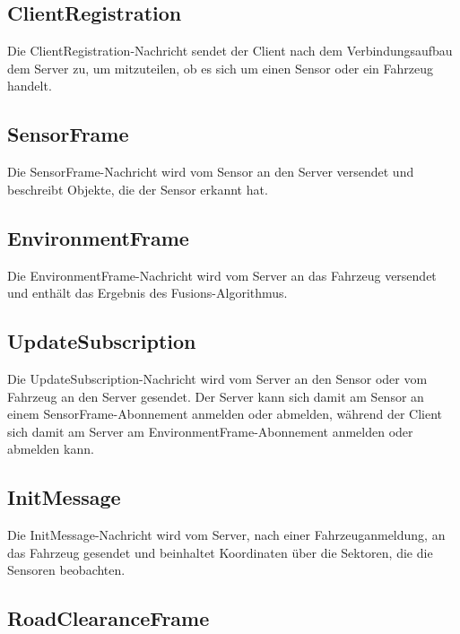 \subsection{ClientRegistration}
\label{msg:client_registration}

Die ClientRegistration-Nachricht sendet der Client nach dem Verbindungsaufbau dem Server zu, um mitzuteilen, ob es sich um einen Sensor oder ein Fahrzeug handelt.

\subsection{SensorFrame}
\label{msg:sensor_frame}

Die SensorFrame-Nachricht wird vom Sensor an den Server versendet und beschreibt Objekte, die der Sensor erkannt hat.

\subsection{EnvironmentFrame}
\label{msg:environment_frame}

Die EnvironmentFrame-Nachricht wird vom Server an das Fahrzeug versendet und enthält das Ergebnis des Fusions-Algorithmus.

\subsection{UpdateSubscription}
\label{msg:update_subscription}

Die UpdateSubscription-Nachricht wird vom Server an den Sensor oder vom Fahrzeug an den Server gesendet.
Der Server kann sich damit am Sensor an einem SensorFrame-Abonnement anmelden oder abmelden, während der Client sich damit am Server am EnvironmentFrame-Abonnement anmelden oder abmelden kann.

\subsection{InitMessage}
\label{msg:init_message}

Die InitMessage-Nachricht wird vom Server, nach einer Fahrzeuganmeldung, an das Fahrzeug gesendet und beinhaltet Koordinaten über die Sektoren, die die Sensoren beobachten.

\subsection{RoadClearanceFrame}

